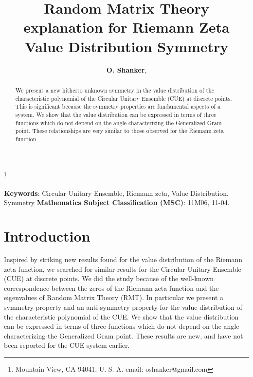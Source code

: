 \documentclass[twoside]{article}
\begin{document}


\newtheorem{theorem}{Theorem}[section]
\newtheorem{lemma}[theorem]{Lemma}

\theoremstyle{definition}
\newtheorem{definition}[theorem]{Definition}
\newtheorem{example}[theorem]{Example}
\newtheorem{xca}[theorem]{Exercise}

\theoremstyle{remark}
\newtheorem{remark}[theorem]{Remark}



\date{}
\lhead[]{}
\rhead[]{}

\title{\bf{Random Matrix Theory explanation for Riemann Zeta Value Distribution Symmetry}}

\maketitle


\author{{\textbf{O. Shanker}},}
\thanks{ Mountain View, CA 94041, U. S. A. email: oshanker@gmail.com}

\thispagestyle{fancy}

\begin{abstract}
We present a new hitherto unknown symmetry in the value
distribution of the characteristic polynomial of the Circular Unitary Ensemble (CUE)
 at discrete points. This is significant because the symmetry properties
are fundamental aspects of a system. We show that the value distribution 
can be expressed in terms of three functions 
which do not depend on the angle characterizing the Generalized Gram point.
These relationships are very similar to those  observed for 
the Riemann zeta function.
\end{abstract}
{\textbf {Keywords}:} Circular Unitary Ensemble, Riemann zeta, Value Distribution, Symmetry 
{\textbf {Mathematics Subject Classification (MSC)}:} 11M06, 11-04.


\symbolfootnote[0]{*}


\section{Introduction}

Inspired by striking new results found for the value distribution of the Riemann zeta function,
we searched for similar results for the Circular Unitary Ensemble (CUE)
at discrete points. We did the study because of the well-known correspondence between the
zeros of the Riemann zeta function and the eigenvalues of Random Matrix Theory (RMT).
In particular we present a symmetry property and an anti-symmetry property for the value
distribution of the characteristic polynomial of the CUE. We show that the value distribution 
can be expressed in terms of three  functions 
which do not depend on the angle characterizing the Generalized Gram point. These results
are new, and have not been reported for the CUE system earlier.
\end{document}

